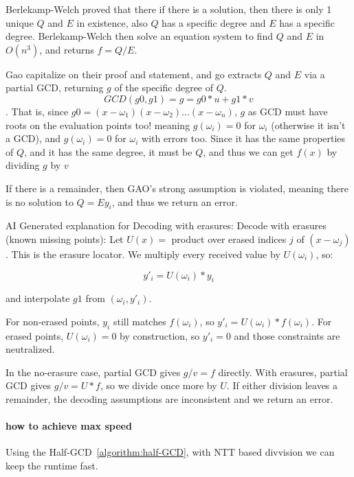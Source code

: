 Berlekamp-Welch proved that there if there is a solution, then there is only 1 unique $Q$ and $E$ in existence,
also $Q$ has a specific degree and $E$ has a specific degree.
Berlekamp-Welch then solve an equation system to find $Q$ and $E$ in $O(n^3)$, and returns $f=Q/E$.

Gao capitalize on their proof and statement, and go extracts $Q$ and $E$ via a partial GCD, returning $g$ of the specific degree of $Q$.
$$GCD(g0,g1)=g=g0*u+g1*v$$.
That is, since $g0=(x-\omega_1)(x-\omega_2)...(x-\omega_n)$, $g$ as GCD must have roots on the evaluation points too!
meaning $g(\omega_i)=0$ for $\omega_i$ (otherwise it isn't a GCD), and $g(\omega_i)=0$ for $\omega_i$ with errors too.
Since it has the same properties of $Q$, and it has the same degree, it must be $Q$, and thus we can get $f(x)$ by dividing $g$ by $v$

If there is a remainder, then GAO's strong assumption is violated, meaning there is no solution to $Q=Ey_i$, and thus we return an error.

AI Generated explanation for Decoding with erasures:
Decode with erasures (known missing points):
Let $U(x)=$ product over erased indices $j$ of $(x - \omega_j)$. This is the erasure locator.
We multiply every received value by $U(\omega_i)$, so:

	$$y'_i = U(\omega_i) * y_i$$

and interpolate $g1$ from $(\omega_i, y'_i)$.

For non-erased points, $y_i$ still matches $f(\omega_i)$, so $y'_i = U(\omega_i)*f(\omega_i)$.
For erased points, $U(\omega_i)=0$ by construction, so $y'_i=0$ and those constraints are neutralized.

In the no-erasure case, partial GCD gives $g/v = f$ directly.
With erasures, partial GCD gives $g/v = U * f$, so we divide once more by $U$.
If either division leaves a remainder, the decoding assumptions are inconsistent and we return an error.


\paragraph{how to achieve max speed}
Using the Half-GCD~\ref{algorithm:half-GCD}, with NTT based divvision we can keep the runtime fast.


